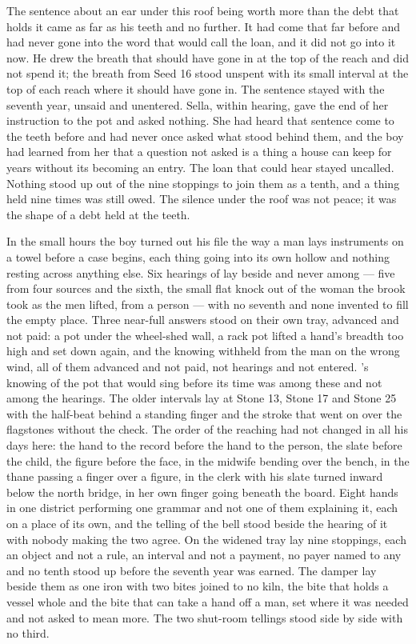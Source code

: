 The sentence about an ear under this roof being worth more than the debt that holds it came as far as his teeth and no further. It had come that far before and had never gone into the word that would call the loan, and it did not go into it now. He drew the breath that should have gone in at the top of the reach and did not spend it; the breath from Seed 16 stood unspent with its small interval at the top of each reach where it should have gone in. The sentence stayed with the seventh year, unsaid and unentered. Sella, within hearing, gave the end of her instruction to the pot and asked nothing. She had heard that sentence come to the teeth before and had never once asked what stood behind them, and the boy had learned from her that a question not asked is a thing a house can keep for years without its becoming an entry. The loan that could hear stayed uncalled. Nothing stood up out of the nine stoppings to join them as a tenth, and a thing held nine times was still owed. The silence under the roof was not peace; it was the shape of a debt held at the teeth.

\scenebreak

In the small hours the boy turned out his file the way a man lays instruments on a towel before a case begins, each thing going into its own hollow and nothing resting across anything else. Six hearings of  lay beside and never among --- five from four sources and the sixth, the small flat knock out of the woman the brook took as the men lifted, from a person --- with no seventh and none invented to fill the empty place. Three near-full answers stood on their own tray, advanced and not paid: a pot under the wheel-shed wall, a rack pot lifted a hand's breadth too high and set down again, and the knowing withheld from the man on the wrong wind, all of them advanced and not paid, not hearings and not entered. 's knowing of the pot that would sing before its time was among these and not among the hearings. The older intervals lay at Stone 13, Stone 17 and Stone 25 with the half-beat behind a standing finger and the stroke that went on over the flagstones without the check. The order of the reaching had not changed in all his days here: the hand to the record before the hand to the person, the slate before the child, the figure before the face, in the midwife bending over the bench, in the thane passing a finger over a figure, in the clerk with his slate turned inward below the north bridge, in her own finger going beneath the board. Eight hands in one district performing one grammar and not one of them explaining it, each on a place of its own, and the telling of the bell stood beside the hearing of it with nobody making the two agree. On the widened tray lay nine stoppings, each an object and not a rule, an interval and not a payment, no payer named to any and no tenth stood up before the seventh year was earned. The damper lay beside them as one iron with two bites joined to no kiln, the bite that holds a vessel whole and the bite that can take a hand off a man, set where it was needed and not asked to mean more. The two shut-room tellings stood side by side with no third.

